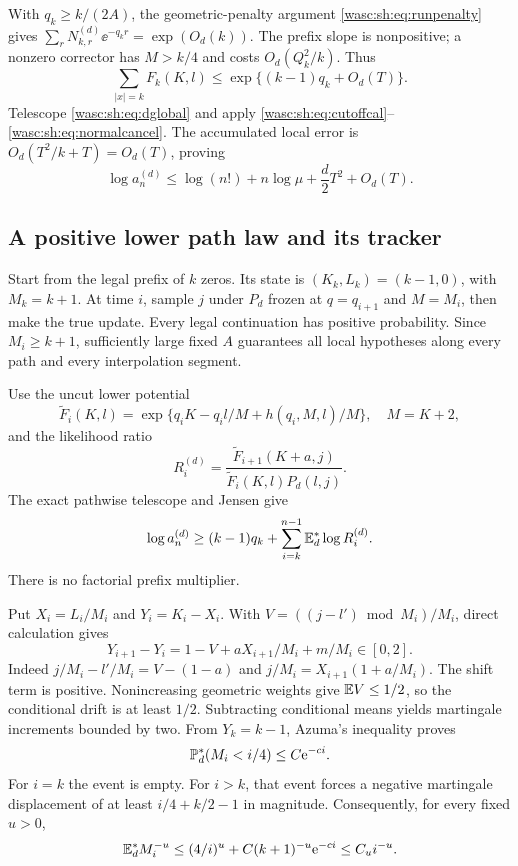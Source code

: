 \documentclass[11pt,a4paper]{article}
\theoremstyle{remark}\newtheorem{remark}[theorem]{Remark}
\numberwithin{equation}{section}
\begin{document}
With $q_k\ge k/(2A)$, the geometric-penalty argument \eqref{wasc:sh:eq:runpenalty} gives $\sum_rN_{k,r}^{(d)}\ee^{-q_kr}=\exp(O_d(k))$. The prefix slope is nonpositive; a nonzero corrector has $M>k/4$ and costs $O_d(Q_k^2/k)$. Thus
\[
\sum_{|x|=k}F_k(K,l)\le\exp\{(k-1)q_k+O_d(T)\}.
\]
Telescope \eqref{wasc:sh:eq:dglobal} and apply \eqref{wasc:sh:eq:cutoffcal}--\eqref{wasc:sh:eq:normalcancel}. The accumulated local error is $O_d(T^2/k+T)=O_d(T)$, proving
\begin{equation}\label{wasc:sh:eq:dupper}
\log a_n^{(d)}\le\log(n!)+n\log\mu+\frac d2T^2+O_d(T).
\end{equation}

\subsection{A positive lower path law and its tracker}
Start from the legal prefix of $k$ zeros. Its state is $(K_k,L_k)=(k-1,0)$, with $M_k=k+1$. At time $i$, sample $j$ under $P_d$ frozen at $q=q_{i+1}$ and $M=M_i$, then make the true update. Every legal continuation has positive probability. Since $M_i\ge k+1$, sufficiently large fixed $A$ guarantees all local hypotheses along every path and every interpolation segment.

Use the uncut lower potential
\[
\widetilde F_i(K,l)=\exp\{q_iK-q_i l/M+h(q_i,M,l)/M\},\quad M=K+2,
\]
and the likelihood ratio
\[
R_i^{(d)}=\frac{\widetilde F_{i+1}(K+a,j)}{\widetilde F_i(K,l)P_d(l,j)}.
\]
The exact pathwise telescope and Jensen give
\begin{equation}\label{wasc:sh:eq:djensen}
\log a_n^{(d)}\ge(k-1)q_k+\sum_{i=k}^{n-1}\mathbb E_d^*\log R_i^{(d)}.
\end{equation}
There is no factorial prefix multiplier.

Put $X_i=L_i/M_i$ and $Y_i=K_i-X_i$. With $V=((j-l')\bmod M_i)/M_i$, direct calculation gives
\begin{equation}\label{wasc:sh:eq:dtracker}
Y_{i+1}-Y_i=1-V+aX_{i+1}/M_i+m/M_i\in[0,2].
\end{equation}
Indeed $j/M_i-l'/M_i=V-(1-a)$ and $j/M_i=X_{i+1}(1+a/M_i)$. The shift term is positive. Nonincreasing geometric weights give $\mathbb E V\le1/2$, so the conditional drift is at least $1/2$. Subtracting conditional means yields martingale increments bounded by two. From $Y_k=k-1$, Azuma's inequality proves
\begin{equation}\label{wasc:sh:eq:dlowprob}
\mathbb P_d^*(M_i<i/4)\le C\mathrm e^{-ci}.
\end{equation}
For $i=k$ the event is empty. For $i>k$, that event forces a negative martingale displacement of at least $i/4+k/2-1$ in magnitude. Consequently, for every fixed $u>0$,
\begin{equation}\label{wasc:sh:eq:dinverse}
\mathbb E_d^*M_i^{-u}\le(4/i)^u+C(k+1)^{-u}\mathrm e^{-ci}\le C_u i^{-u}.
\end{equation}
\end{document}
